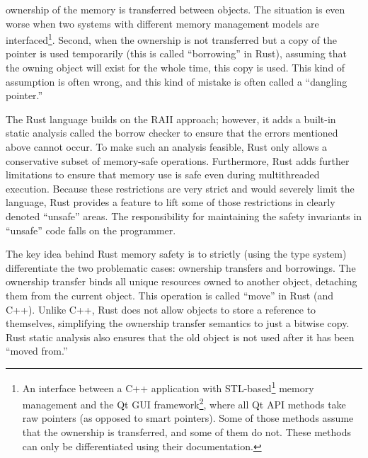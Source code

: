 \documentclass[
  11pt,
  twoside,symmetric]{report}
\DeclareRobustCommand{\href}[2]{#2\footnote{\url{#1}}}
\begin{document}
ownership of the memory is transferred between objects. The situation is
even worse when two systems with different memory management models are
interfaced\footnote{An interface between a C++ application with
  \href{https://www.cppreference.com/Cpp_STL_ReferenceManual.pdf}{STL-based}
  memory management and the \href{https://www.qt.io/}{Qt GUI framework},
  where all Qt API methods take raw pointers (as opposed to smart
  pointers). Some of those methods assume that the ownership is
  transferred, and some of them do not. These methods can only be
  differentiated using their documentation.}. Second, when the ownership
is not transferred but a copy of the pointer is used temporarily (this
is called ``borrowing'' in Rust), assuming that the owning object will
exist for the whole time, this copy is used. This kind of assumption is
often wrong, and this kind of mistake is often called a ``dangling
pointer.''

The Rust language builds on the RAII approach; however, it adds a
built-in static analysis called the borrow checker to ensure that the
errors mentioned above cannot occur. To make such an analysis feasible,
Rust only allows a conservative subset of memory-safe operations.
Furthermore, Rust adds further limitations to ensure that memory use is
safe even during multithreaded execution. Because these restrictions are
very strict and would severely limit the language, Rust provides a
feature to lift some of those restrictions in clearly denoted ``unsafe''
areas. The responsibility for maintaining the safety invariants in
``unsafe'' code falls on the programmer.

The key idea behind Rust memory safety is to strictly (using the type
system) differentiate the two problematic cases: ownership transfers and
borrowings. The ownership transfer binds all unique resources owned to
another object, detaching them from the current object. This operation
is called ``move'' in Rust (and C++). Unlike C++, Rust does not allow
objects to store a reference to themselves, simplifying the ownership
transfer semantics to just a bitwise copy. Rust static analysis also
ensures that the old object is not used after it has been ``moved
from.''
\end{document}
